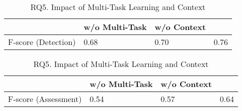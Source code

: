 \begin{table}[t]
	\caption{RQ5. Impact of Multi-Task Learning and Context}
	\vspace{-10pt}
	\begin{center}
\small
		\tabcolsep 2.5pt
		\renewcommand{\arraystretch}{1}
                \begin{tabular}
                {p{2.5cm}<{\centering}|p{2.5cm}<{\centering}| p{2cm}<{\centering}| p{0.6cm}<{\centering}}
			
			\hline
			                   &  {\tool} w/o Multi-Task  &  {\tool} w/o Context & {\tool} \\ 
			\hline
		       F-score (Detection)   & 0.68  &  0.70 & 0.76       \\
			\hline
		\end{tabular}
		\label{tab:impact-multi-task-on-detection}
	\end{center}
\end{table}

\begin{table}[t]
	\caption{RQ5. Impact of Multi-Task Learning and Context}
	\vspace{-10pt}
	\begin{center}
\small
		\tabcolsep 2.5pt
		\renewcommand{\arraystretch}{1}
                \begin{tabular}
                {p{2.5cm}<{\centering}|p{2.5cm}<{\centering}| p{2cm}<{\centering}| p{0.6cm}<{\centering}}
			
			\hline
			                   &  {\tool} w/o Multi-Task  &  {\tool} w/o Context & {\tool} \\ 
			\hline
		       F-score (Assessment)   & 0.54  &  0.57 & 0.64     \\
			\hline
		\end{tabular}
		\label{tab:impact-multi-task-on-assessment}
	\end{center}
\end{table}

%			


